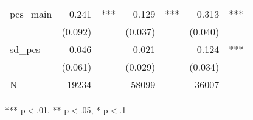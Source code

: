 \begin{table}[!h]
\begin{tabular}{lllllll}
\multicolumn{1}{l}{pcs\_main} &
  \multicolumn{1}{r}{0.241} &
  \multicolumn{1}{l}{***} &
  \multicolumn{1}{r}{0.129} &
  \multicolumn{1}{l}{***} &
  \multicolumn{1}{r}{0.313} &
  \multicolumn{1}{l}{***} \\
\multicolumn{1}{l}{} &
  \multicolumn{1}{r}{(0.092)} &
  \multicolumn{1}{l}{} &
  \multicolumn{1}{r}{(0.037)} &
  \multicolumn{1}{l}{} &
  \multicolumn{1}{r}{(0.040)} &
  \multicolumn{1}{l}{} \\
\multicolumn{1}{l}{sd\_pcs} &
  \multicolumn{1}{r}{-0.046} &
  \multicolumn{1}{l}{} &
  \multicolumn{1}{r}{-0.021} &
  \multicolumn{1}{l}{} &
  \multicolumn{1}{r}{0.124} &
  \multicolumn{1}{l}{***} \\
\multicolumn{1}{l}{} &
  \multicolumn{1}{r}{(0.061)} &
  \multicolumn{1}{l}{} &
  \multicolumn{1}{r}{(0.029)} &
  \multicolumn{1}{l}{} &
  \multicolumn{1}{r}{(0.034)} &
  \multicolumn{1}{l}{} \\
\multicolumn{1}{l}{N} &
  \multicolumn{1}{r}{19234} &
  \multicolumn{1}{l}{} &
  \multicolumn{1}{r}{58099} &
  \multicolumn{1}{l}{} &
  \multicolumn{1}{r}{36007} &
  \multicolumn{1}{l}{} \\
\cline{1-7}
\end{tabular}

\footnotesize{
*** p$<$.01, ** p$<$.05, * p$<$.1
}
\end{table}